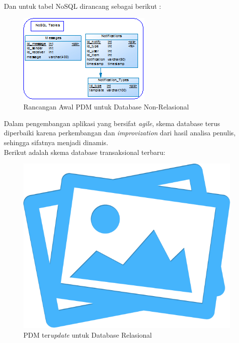 	Dan untuk tabel NoSQL dirancang sebagai berikut :
	\begin{figure}[H]
		\centering
		\includegraphics[width=\textwidth]{images/bab3/db/pdm-nosql-awal.png}
		\caption{Rancangan Awal PDM untuk Database Non-Relasional}
		\label{pdm-nosql-awal}
	\end{figure}
	
	\indent Dalam pengembangan aplikasi yang bersifat \textit{agile}, skema database terus diperbaiki karena perkembangan dan \textit{improvization} dari hasil analisa penulis, sehingga sifatnya menjadi dinamis.\\
	
	Berikut adalah skema database transaksional terbaru:
	\begin{figure}[H]
		\centering
		\includegraphics[width=0.4\textheight]{images/no-image.png}
		\caption{PDM ter\textit{update} untuk Database Relasional}
		\label{pdm-final}
	\end{figure}
	
